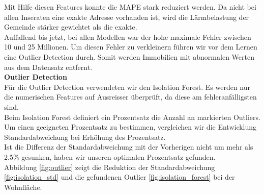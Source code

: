 %
Mit Hilfe diesen Features konnte die MAPE stark reduziert werden. Da nicht bei allen Inseraten eine exakte Adresse vorhanden ist, wird die Lärmbelastung der Gemeinde stärker gewichtet als die exakte.\\[2ex]
%
Auffallend bis jetzt, bei allen Modellen war der hohe maximale Fehler zwischen 10 und 25 Millionen. Um diesen Fehler zu verkleinern führen wir vor dem Lernen eine Outlier Detection durch. Somit werden Immobilien mit abnormalen Werten aus dem Datensatz entfernt.\\[2ex]
%
\textbf{Outlier Detection}\\
Für die Outlier Detection verwendeten wir den Isolation Forest. Es werden nur die numerischen Features auf Ausreisser überprüft, da diese am fehleranfälligsten sind.\\[2ex]
%
Beim Isolation Forest definiert ein Prozentsatz die Anzahl an markierten Outliers.
Um einen geeigneten Prozentsatz zu bestimmen, vergleichen wir die Entwicklung Standardabweichung bei Erhöhung des Prozentsatz.\\
Ist die Differenz der Standardabweichung mit der Vorherigen nicht um mehr als 2.5\% gesunken, haben wir unseren optimalen Prozentsatz gefunden.\\
Abbildung \ref{fig:outlier} zeigt die Reduktion der Standardabweichung \ref{fig:isolation_std} und die gefundenen Outlier \ref{fig:isolation_forest} bei der Wohnfläche.

